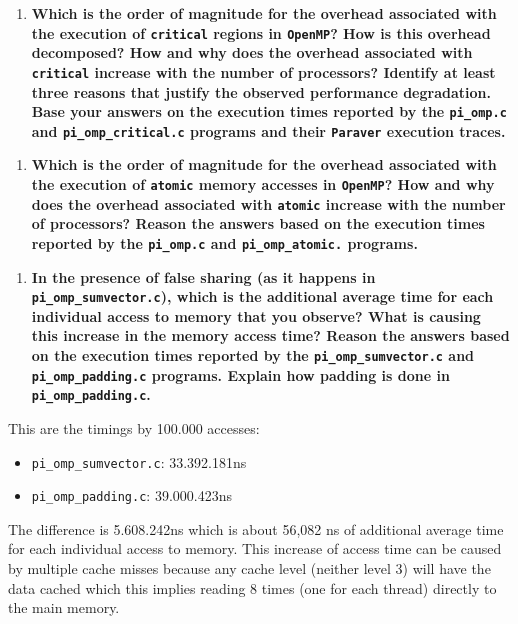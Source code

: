 \documentclass[a4paper]{article}
\begin{document}
\begin{enumerate}[resume]
	\item \textbf{Which is the order of magnitude for the overhead associated with the execution of \texttt{critical} regions in \texttt{OpenMP}? How is this overhead decomposed? How and why does the overhead associated with \texttt{critical} increase with the number of processors? Identify at least three reasons that justify the observed performance degradation. Base your answers on the execution times reported by the \texttt{pi\_omp.c} and \texttt{pi\_omp\_critical.c} programs and their \texttt{Paraver} execution traces.}
\end{enumerate}

\begin{enumerate}[resume]
	\item \textbf{Which is the order of magnitude for the overhead associated with the execution of \texttt{atomic} memory accesses in \texttt{OpenMP}? How and why does the overhead associated with \texttt{atomic} increase with the number of processors? Reason the answers based on the execution times reported by the \texttt{pi\_omp.c} and \texttt{pi\_omp\_atomic.} programs.}
\end{enumerate}

\begin{enumerate}[resume]
	\item \textbf{In the presence of false sharing (as it happens in \texttt{pi\_omp\_sumvector.c}), which is the additional average time for each individual access to memory that you observe? What is causing this increase in the memory access time? Reason the answers based on the execution times reported by the \texttt{pi\_omp\_sumvector.c} and \texttt{pi\_omp\_padding.c} programs. Explain how padding is done in \texttt{pi\_omp\_padding.c}.}
\end{enumerate}

This are the timings by 100.000 accesses:
\begin{itemize}
	\item \verb|pi_omp_sumvector.c|: 33.392.181ns
	\item \verb|pi_omp_padding.c|: 39.000.423ns
\end{itemize}

The difference is 5.608.242ns which is about 56,082 ns of additional average time for each individual access to memory. This increase of access time can be caused by multiple cache misses because any cache level (neither level 3) will have the data cached which this implies reading 8 times (one for each thread) directly to the main memory.
\end{document}
